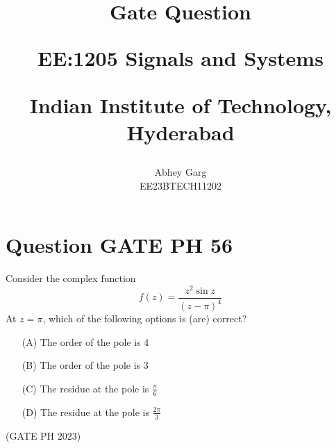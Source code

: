 \documentclass[journal,12pt,twocolumn]{IEEEtran}
\theoremstyle{remark}
\begin{document}
%




\vspace{3cm}

\title{
Gate Question

\large{EE:1205 Signals and Systems}

Indian Institute of Technology, Hyderabad
}
\author{Abhey Garg

EE23BTECH11202
}	


\maketitle

\newpage


\bigskip

\renewcommand{\thefigure}{\arabic{figure}}
\renewcommand{\thetable}{\arabic{table}}
\renewcommand{\theequation}{\arabic{equation}}

\section{Question GATE PH 56}
Consider the complex function
\[ f(z) = \frac{z^{2}\sin z}{(z-\pi)^4} \]
At \( z = \pi \), which of the following options is (are) correct?
\begin{enumerate}[label=\textbf{\arabic*.}, font=\bfseries, align=left]
    \item[(A)] The order of the pole is 4 
    \item[(B)] The order of the pole is 3 
    \item[(C)] The residue at the pole is \( \frac{\pi}{6} \)
    \item[(D)] The residue at the pole is \( \frac{2\pi}{3} \)
\end{enumerate}
\hfill (GATE PH 2023)
\end{document}

